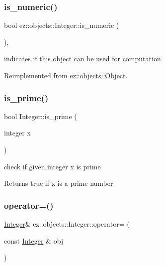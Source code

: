 \subsubsection{\texorpdfstring{is\+\_\+numeric()}{is\_numeric()}}
{\footnotesize\ttfamily bool ez\+::objects\+::\+Integer\+::is\+\_\+numeric (\begin{DoxyParamCaption}{ }\end{DoxyParamCaption})\hspace{0.3cm}{\ttfamily [inline]}, {\ttfamily [virtual]}}

indicates if this object can be used for computation 

Reimplemented from \hyperlink{classez_1_1objects_1_1Object_a19ba1672d4063232c4619e016ca178f8}{ez\+::objects\+::\+Object}.

\mbox{\label{classez_1_1objects_1_1Integer_a27467dd30f1b4d62119bc5630f6633d6}} 
\subsubsection{\texorpdfstring{is\+\_\+prime()}{is\_prime()}}
{\footnotesize\ttfamily bool Integer\+::is\+\_\+prime (\begin{DoxyParamCaption}\item[{integer}]{x }\end{DoxyParamCaption})\hspace{0.3cm}{\ttfamily [static]}}

check if given integer x is prime \begin{DoxyReturn}{Returns}
true if x is a prime number 
\end{DoxyReturn}
\mbox{\label{classez_1_1objects_1_1Integer_ae52610e2e76d891ac3c559c2b2d5ff3e}} 
\subsubsection{\texorpdfstring{operator=()}{operator=()}}
{\footnotesize\ttfamily \hyperlink{classez_1_1objects_1_1Integer}{Integer}\& ez\+::objects\+::\+Integer\+::operator= (\begin{DoxyParamCaption}\item[{const \hyperlink{classez_1_1objects_1_1Integer}{Integer} \&}]{obj }\end{DoxyParamCaption})\hspace{0.3cm}{\ttfamily [inline]}}

